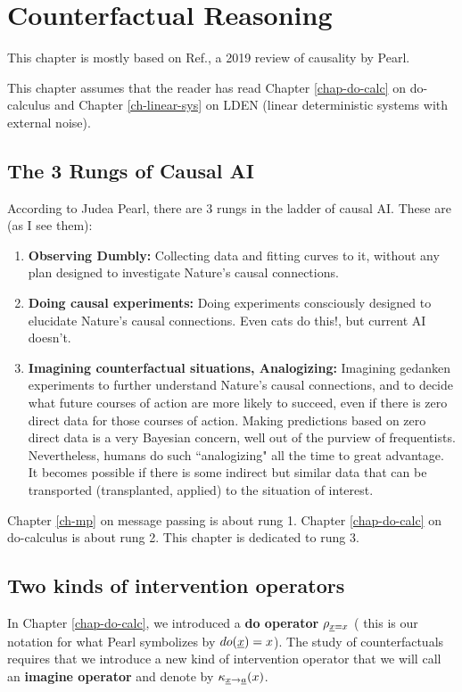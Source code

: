 \chapter{Counterfactual Reasoning}
\label{ch-counterf}
This chapter is mostly based on 
Ref.\cite{pearl-2019review}, a 2019
 review of causality by Pearl.

This chapter
assumes that the reader
has read
Chapter \ref{chap-do-calc}
on do-calculus and
Chapter \ref{ch-linear-sys}  
on LDEN (linear 
deterministic systems
with external noise).

\section*{The 3 Rungs of Causal AI}
According to 
Judea Pearl,
there are 3 rungs in the
ladder of causal AI.
These are (as I see them):
\begin{enumerate}
\item
{\bf Observing Dumbly:} Collecting 
data
and fitting curves to it,
without any plan 
designed to
investigate Nature's 
causal connections.
\item {\bf Doing causal
experiments:} 
Doing experiments 
consciously designed to
elucidate
Nature's causal connections.
Even cats do this!, but current AI doesn't.
\item {\bf Imagining
 counterfactual situations, Analogizing:}
Imagining gedanken experiments
to further understand
Nature's causal connections,
and to decide what future
courses of action are
more likely to succeed,
even if there is zero
direct data for 
those courses of action.
Making
predictions based
on zero direct data is a very Bayesian
concern, well out of the purview of 
frequentists. Nevertheless,
humans do such
``analogizing" 
all the time to great advantage.
It becomes
possible if there
is some indirect but similar
data that can be transported
(transplanted, applied)
to the situation of
interest.
\end{enumerate}
Chapter \ref{ch-mp}
on message passing
is about rung 1.
Chapter \ref{chap-do-calc}
on do-calculus is about rung 2.
This chapter is dedicated to rung 3.



\section*{Two kinds of
 intervention operators}
In Chapter \ref{chap-do-calc},
we introduced a {\bf do operator}
$\rho_{{\underline{x}}=x}$ (
this is our notation for what Pearl 
symbolizes by $do({\underline{x}})=x$).
The study of counterfactuals 
requires that we
introduce a new
kind of intervention
operator that we will
call an {\bf imagine operator}
and denote by $\kappa_{{\underline{x}}\rightarrow{\underline{a}}}(x)$.


